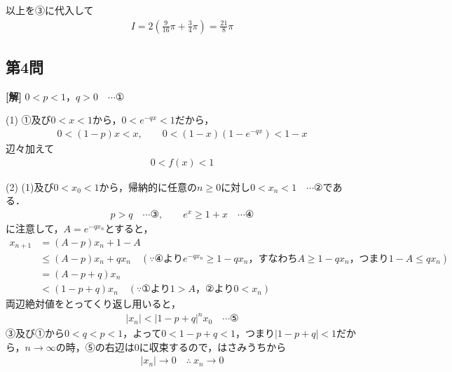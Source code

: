 \documentclass[../main.tex]{subfiles}
\begin{document}
以上を③に代入して
\begin{align*}
  I=2\left(\frac9{16}\pi+\frac34\pi\right)=\frac{21}8\pi
\end{align*}

\subsection*{第4問}

{\bf [解]}
$0<p<1$，$q>0\quad\cdots①$

(1) ①及び$0<x<1$から，$0<e^{-qx}<1$だから，
\begin{align*}
  0<(1-p)x<x,\qquad0<(1-x)(1-e^{-qx})<1-x
\end{align*}
辺々加えて
\begin{align*}
  0<f(x)<1
\end{align*}

(2) (1)及び$0<x_0<1$から，帰納的に任意の$n\ge0$に対し$0<x_n<1\quad\cdots②$である．
\begin{align*}
  p>q\quad\cdots③,\qquad e^x\ge1+x\quad\cdots④
\end{align*}
に注意して，$A=e^{-qx_n}$とすると，
\begin{align*}
  x_{n+1}&=(A-p)x_n+1-A\\
  &\le(A-p)x_n+qx_n\quad(\because④より e^{-qx_n}\ge1-qx_n\text{，すなわち}A\ge1-qx_n\text{，つまり}1-A\le qx_n)\\
  &=(A-p+q)x_n\\
  &<(1-p+q)x_n\quad(\because①より1>A，②より0<x_n)
\end{align*}
両辺絶対値をとってくり返し用いると，
\begin{align*}
  |x_n|<|1-p+q|^nx_0\quad\cdots⑤
\end{align*}
③及び①から$0<q<p<1$，よって$0<1-p+q<1$，つまり$|1-p+q|<1$だから，$n\to\infty$の時，⑤の右辺は$0$に収束するので，はさみうちから
\begin{align*}
  |x_n|\to0\quad\therefore\ x_n\to0
\end{align*}
\end{document}
